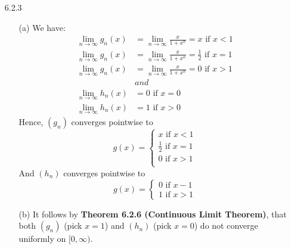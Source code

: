 \documentclass[11pt]{article}
\begin{document}
\begin{itemize}
    \newpage

    \item[6.2.3]
        \begin{itemize}
            \item[(a)]
                We have:
                \begin{align*}
                    \lim_{n \to \infty}{g_n(x)}
                        &= \lim_{n \to \infty}{\frac{x}{1 + x^n}}
                        = x \text{ if $x < 1$}\\
                    \lim_{n \to \infty}{g_n(x)}
                        &= \lim_{n \to \infty}{\frac{x}{1 + x^n}}
                        = \frac{1}{2} \text{ if $x = 1$}\\
                    \lim_{n \to \infty}{g_n(x)}
                        &= \lim_{n \to \infty}{\frac{x}{1 + x^n}}
                        = 0 \text{ if $x > 1$}\\
                    &and\\
                    \lim_{n \to \infty}{h_n(x)}
                        &= 0 \text{ if $x = 0$}\\
                    \lim_{n \to \infty}{h_n(x)}
                        &= 1 \text{ if $x > 0$}
                \end{align*}
                Hence, $(g_n)$ converges pointwise to
                \begin{equation*}
                    g(x) = 
                    \begin{cases}
                        x \text{ if $x < 1$}\\
                        \frac{1}{2} \text{ if $x = 1$}\\
                        0 \text{ if $x > 1$}\\
                    \end{cases}
                \end{equation*}
                And $(h_n)$ converges pointwise to
                \begin{equation*}
                    g(x) = 
                    \begin{cases}
                        0 \text{ if $x - 1$}\\
                        1 \text{ if $x > 1$}
                    \end{cases}
                \end{equation*}

            \item[(b)]
                It follows by \textbf{Theorem 6.2.6 (Continuous Limit
                Theorem)}, that both $(g_n)$ (pick $x = 1$) and $(h_n)$ (pick
                $x = 0$) do not converge uniformly on $[0, \infty)$.


\end{itemize}
\end{itemize}
\end{document}
